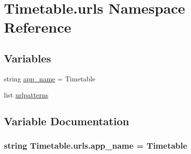 \hypertarget{namespaceTimetable_1_1urls}{}\section{Timetable.\+urls Namespace Reference}
\label{namespaceTimetable_1_1urls}
\subsection*{Variables}
\begin{DoxyCompactItemize}
\item 
string \hyperlink{namespaceTimetable_1_1urls_aa2dab9a5e811ab4022e461c788c1ca84}{app\+\_\+name} = \textquotesingle{}Timetable\textquotesingle{}
\item 
list \hyperlink{namespaceTimetable_1_1urls_a9b085aa04f9d12160617bad02eae0ab2}{urlpatterns}
\end{DoxyCompactItemize}


\subsection{Variable Documentation}
\subsubsection[{\texorpdfstring{app\+\_\+name}{app_name}}]{\setlength{\rightskip}{0pt plus 5cm}string Timetable.\+urls.\+app\+\_\+name = \textquotesingle{}Timetable\textquotesingle{}}\hypertarget{namespaceTimetable_1_1urls_aa2dab9a5e811ab4022e461c788c1ca84}{}\label{namespaceTimetable_1_1urls_aa2dab9a5e811ab4022e461c788c1ca84}
